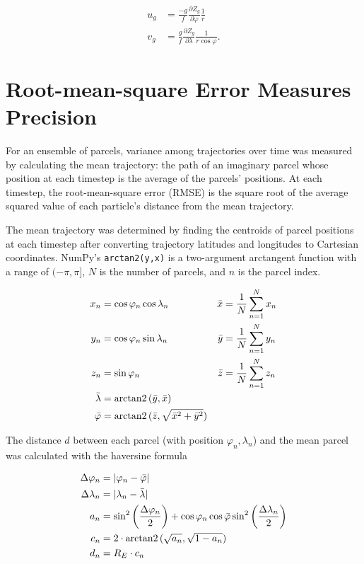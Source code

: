 \begin{align}
    u_g &= \frac{-g}{f} \frac{\partial Z_g}{\partial \varphi} \frac{1}{r} \\
    v_g &= \frac{g}{f} \frac{\partial Z_g}{\partial \lambda} \frac{1}{r \cos{\varphi}}.
\end{align}

\section{Root-mean-square Error Measures Precision}
For an ensemble of parcels, variance among trajectories over time was measured by calculating the mean trajectory: the path of an imaginary parcel whose position at each timestep is the average of the parcels' positions.
At each timestep, the root-mean-square error (RMSE) is the square root of the average squared value of each particle's distance from the mean trajectory.

The mean trajectory was determined by finding the centroids of parcel positions at each timestep after converting trajectory latitudes and longitudes to Cartesian coordinates. 
NumPy's \texttt{arctan2(y,x)} is a two-argument arctangent function with a range of $(-\pi, \pi]$, $N$ is the number of parcels, and $n$ is the parcel index.

\begin{align}
    x_n &= \cos \varphi_n \cos \lambda_n & \bar{x} &= \frac{1}{N} \sum_{n = 1}^{N} x_n \\
    y_n &= \cos \varphi_n \sin \lambda_n & \bar{y} &= \frac{1}{N} \sum_{n = 1}^{N} y_n \\
    z_n &= \sin \varphi_n & \bar{z} &= \frac{1}{N} \sum_{n = 1}^{N} z_n \\
    \bar{\lambda} &= \operatorname{arctan2}{(\bar{y},\bar{x})} \\
    \bar{\varphi} &= \operatorname{arctan2}{(\bar{z}, \sqrt{\bar{x}^2 + \bar{y}^2})}
\end{align}

The distance $d$ between each parcel (with position $\varphi_n, \lambda_n$) and the mean parcel was calculated with the haversine formula

\begin{align}
    \Delta \varphi_n &= | \varphi_n - \bar{\varphi}| \label{eq:delta_lat} \\
    \Delta \lambda_n &= |\lambda_n - \bar{\lambda}| \label{eq:delta_lon} \\
    a_n &= \sin^2 \left ( \frac{\Delta \varphi_n}{2} \right ) + \cos{\varphi_n}  \cos{\bar{\varphi}} \sin^2 \left ( \frac{\Delta \lambda_n}{2} \right ) \\
    c_n &= 2 \cdot \operatorname{arctan2}{(\sqrt{a_n}, \sqrt{1 - a_n})} \\
    d_n &= R_E \cdot c_n
\end{align}


